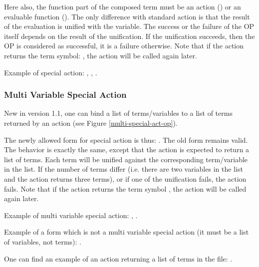 
Here also, the function part of the composed term must be an action
() or an evaluable function ().  The only difference with standard action is that the result
of the evaluation is unified with the variable. The success or the failure
of the OP itself depends on the result of the unification. If the
unification succeeds, then the OP is considered as successful, it is a
failure otherwise. Note that if the action returns the term symbol:
, the action will be called again later.

Example of special action: , , .

\subsubsection{Multi Variable Special Action}


New in version 1.1, one can bind a list of terms/variables to a list of
terms returned by an action (see Figure \ref{multi-special-act-op}).

The newly allowed form for special action is thus: \*
.\*
The old form remains valid. The behavior is exactly the same, except that
the action is expected to return a list of terms. Each term will be
unified against the corresponding term/variable in the list. If the number
of terms differ (i.e. there are two variables in the list and the action
returns three terms), or if one of the unification fails, the action
fails. Note that if the action returns the term symbol , the
action will be called again later.

Example of multi variable special action:\*
,\*
.

Example of a form which is not a multi variable special action (it must be a
list of variables, not terms):\*
.

One can find an example of an action returning a list of terms in the
file: .

